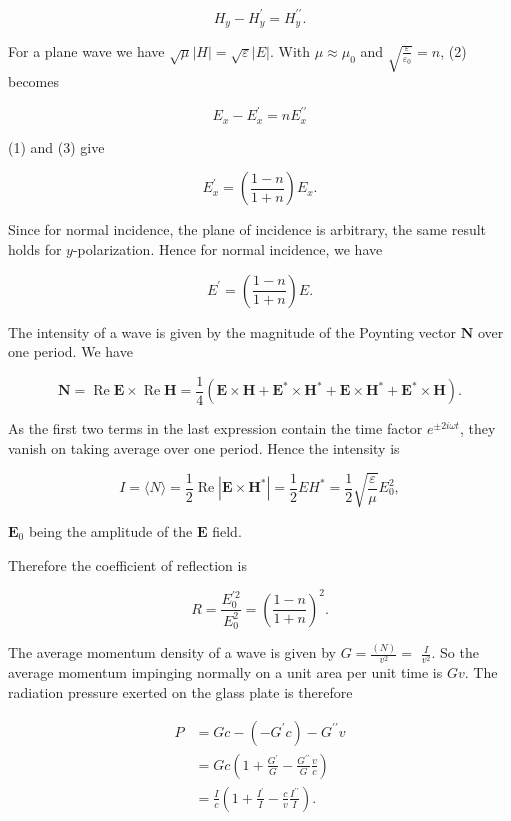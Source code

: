 \documentclass[10pt]{article}
\begin{document}
$$
H_{y}-H_{y}^{\prime}=H_{y}^{\prime \prime} .
$$

For a plane wave we have $\sqrt{\mu}|H|=\sqrt{\varepsilon}|E|$. With $\mu \approx \mu_{0}$ and $\sqrt{\frac{\varepsilon}{\varepsilon_{0}}}=n$,
(2) becomes

$$
E_{x}-E_{x}^{\prime}=n E_{x}^{\prime \prime}
$$

(1) and (3) give

$$
E_{x}^{\prime}=\left(\frac{1-n}{1+n}\right) E_{x} .
$$

Since for normal incidence, the plane of incidence is arbitrary, the same result holds for $y$-polarization. Hence for normal incidence, we have

$$
E^{\prime}=\left(\frac{1-n}{1+n}\right) E .
$$

The intensity of a wave is given by the magnitude of the Poynting vector $\mathbf{N}$ over one period. We have

$$
\mathbf{N}=\operatorname{Re} \mathbf{E} \times \operatorname{Re} \mathbf{H}=\frac{1}{4}\left(\mathbf{E} \times \mathbf{H}+\mathbf{E}^{*} \times \mathbf{H}^{*}+\mathbf{E} \times \mathbf{H}^{*}+\mathbf{E}^{*} \times \mathbf{H}\right) .
$$

As the first two terms in the last expression contain the time factor $e^{\pm 2 i \omega t}$, they vanish on taking average over one period. Hence the intensity is

$$
I=\langle N\rangle=\frac{1}{2} \operatorname{Re}\left|\mathbf{E} \times \mathbf{H}^{*}\right|=\frac{1}{2} E H^{*}=\frac{1}{2} \sqrt{\frac{\varepsilon}{\mu}} E_{0}^{2},
$$

$\mathbf{E}_{0}$ being the amplitude of the $\mathbf{E}$ field.

Therefore the coefficient of reflection is

$$
R=\frac{E_{0}^{\prime 2}}{E_{0}^{2}}=\left(\frac{1-n}{1+n}\right)^{2} .
$$

 The average momentum density of a wave is given by $G=\frac{(N)}{v^{2}}=$ $\frac{I}{v^{2}}$. So the average momentum impinging normally on a unit area per unit time is $G v$. The radiation pressure exerted on the glass plate is therefore

$$
\begin{aligned}
P &=G c-\left(-G^{\prime} c\right)-G^{\prime \prime} v \\
&=G c\left(1+\frac{G^{\prime}}{G}-\frac{G^{\prime \prime}}{G} \frac{v}{c}\right) \\
&=\frac{I}{c}\left(1+\frac{I^{\prime}}{I}-\frac{c}{v} \frac{I^{\prime \prime}}{I}\right) .
\end{aligned}
$$
\end{document}
